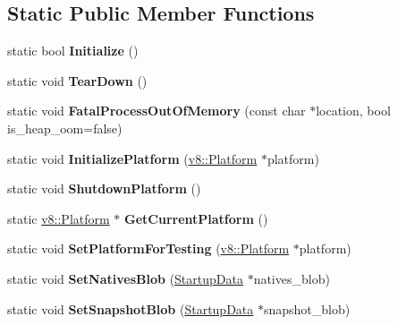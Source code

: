 \subsection*{Static Public Member Functions}
\begin{DoxyCompactItemize}
\item 
static bool {\bfseries Initialize} ()\hypertarget{classv8_1_1internal_1_1_v8_a22c0e7b7018fdef4b484c432e2725f96}{}\label{classv8_1_1internal_1_1_v8_a22c0e7b7018fdef4b484c432e2725f96}

\item 
static void {\bfseries Tear\+Down} ()\hypertarget{classv8_1_1internal_1_1_v8_a216fa3810e9a2014d650162e53bc3576}{}\label{classv8_1_1internal_1_1_v8_a216fa3810e9a2014d650162e53bc3576}

\item 
static void {\bfseries Fatal\+Process\+Out\+Of\+Memory} (const char $\ast$location, bool is\+\_\+heap\+\_\+oom=false)\hypertarget{classv8_1_1internal_1_1_v8_ae5d70d58762fa68b4a2a21787e7d6b67}{}\label{classv8_1_1internal_1_1_v8_ae5d70d58762fa68b4a2a21787e7d6b67}

\item 
static void {\bfseries Initialize\+Platform} (\hyperlink{classv8_1_1_platform}{v8\+::\+Platform} $\ast$platform)\hypertarget{classv8_1_1internal_1_1_v8_a5f5a64c4edc23f8a5674a05038417260}{}\label{classv8_1_1internal_1_1_v8_a5f5a64c4edc23f8a5674a05038417260}

\item 
static void {\bfseries Shutdown\+Platform} ()\hypertarget{classv8_1_1internal_1_1_v8_a04db7c30414303a26aa5b7949428b8ff}{}\label{classv8_1_1internal_1_1_v8_a04db7c30414303a26aa5b7949428b8ff}

\item 
static \hyperlink{classv8_1_1_platform}{v8\+::\+Platform} $\ast$ {\bfseries Get\+Current\+Platform} ()\hypertarget{classv8_1_1internal_1_1_v8_a5eb1d47c492fa1e85e7d7c31dd5cf2bb}{}\label{classv8_1_1internal_1_1_v8_a5eb1d47c492fa1e85e7d7c31dd5cf2bb}

\item 
static void {\bfseries Set\+Platform\+For\+Testing} (\hyperlink{classv8_1_1_platform}{v8\+::\+Platform} $\ast$platform)\hypertarget{classv8_1_1internal_1_1_v8_a01b0c617b00a393381659b7ef884da5a}{}\label{classv8_1_1internal_1_1_v8_a01b0c617b00a393381659b7ef884da5a}

\item 
static void {\bfseries Set\+Natives\+Blob} (\hyperlink{classv8_1_1_startup_data}{Startup\+Data} $\ast$natives\+\_\+blob)\hypertarget{classv8_1_1internal_1_1_v8_a6201c68cdcd687e0cc40552c0915ab1e}{}\label{classv8_1_1internal_1_1_v8_a6201c68cdcd687e0cc40552c0915ab1e}

\item 
static void {\bfseries Set\+Snapshot\+Blob} (\hyperlink{classv8_1_1_startup_data}{Startup\+Data} $\ast$snapshot\+\_\+blob)\hypertarget{classv8_1_1internal_1_1_v8_a474be8cbefa4b1c26661a238d14179c0}{}\label{classv8_1_1internal_1_1_v8_a474be8cbefa4b1c26661a238d14179c0}

\end{DoxyCompactItemize}

